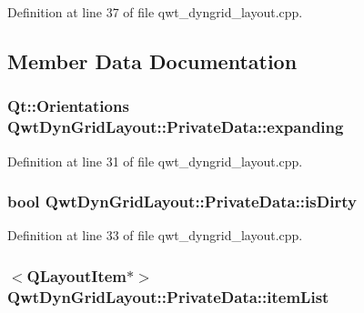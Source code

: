 Definition at line 37 of file qwt\-\_\-dyngrid\-\_\-layout.\-cpp.



\subsection{Member Data Documentation}
\hypertarget{class_qwt_dyn_grid_layout_1_1_private_data_a6dad3a2a6a8c5f6f7d5646ea91ea8f29}{
\subsubsection[{expanding}]{\setlength{\rightskip}{0pt plus 5cm}Qt\-::\-Orientations Qwt\-Dyn\-Grid\-Layout\-::\-Private\-Data\-::expanding}}\label{class_qwt_dyn_grid_layout_1_1_private_data_a6dad3a2a6a8c5f6f7d5646ea91ea8f29}


Definition at line 31 of file qwt\-\_\-dyngrid\-\_\-layout.\-cpp.

\hypertarget{class_qwt_dyn_grid_layout_1_1_private_data_a3ac83e194b4c54ae90e4d93b5e8bf061}{
\subsubsection[{is\-Dirty}]{\setlength{\rightskip}{0pt plus 5cm}bool Qwt\-Dyn\-Grid\-Layout\-::\-Private\-Data\-::is\-Dirty}}\label{class_qwt_dyn_grid_layout_1_1_private_data_a3ac83e194b4c54ae90e4d93b5e8bf061}


Definition at line 33 of file qwt\-\_\-dyngrid\-\_\-layout.\-cpp.

\hypertarget{class_qwt_dyn_grid_layout_1_1_private_data_a2db2d5137324df86633368e30480ea9f}{
\subsubsection[{item\-List}]{$<$Q\-Layout\-Item$\ast$$>$ Qwt\-Dyn\-Grid\-Layout\-::\-Private\-Data\-::item\-List\hspace{0.3cm}{\ttfamily [mutable]}}}\label{class_qwt_dyn_grid_layout_1_1_private_data_a2db2d5137324df86633368e30480ea9f}


